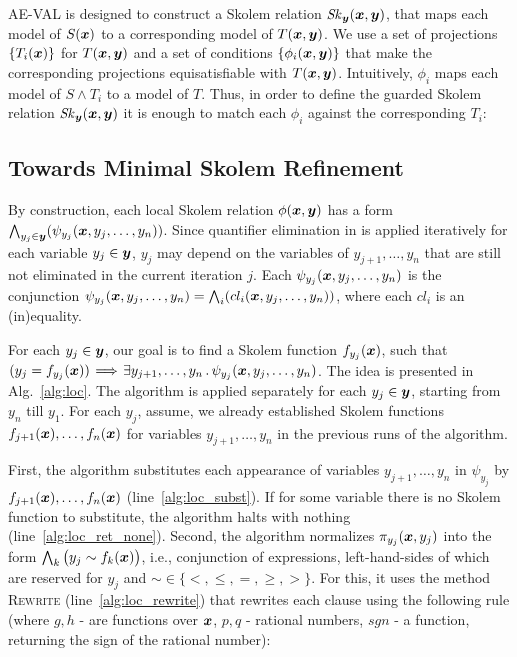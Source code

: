 \textsc{AE-VAL} is designed to
construct a Skolem relation
${\mathit{Sk}_{\vy} (\vx, \vy)}$, that maps each
model of $S(\vx)$ to a corresponding model of $T(\vx,\vy)$.
We use a set of
projections $\{T_{i}(\vx)\}$ for $T(\vx,\vy)$ and a set of conditions $\{\phi_i
(\vx, \vy)\}$
that make the corresponding projections equisatisfiable with $T(\vx,\vy)$.
Intuitively, $\phi_i$ maps each model of $S \land T_{i}$ to a model of $T$.
Thus, in order to define the guarded Skolem relation $\mathit{Sk}_{\vy}(\vx, \vy)$ it is enough to 
match each $\phi_i$ against the corresponding $T_{i}$:

\skolemcases


\subsection{Towards Minimal Skolem Refinement}
\label{sec:new}

\localfactoralg

By construction, each local Skolem relation $\phi(\vx,\vy)$ has a form $\Land_{y_j \in \vy}(\psi_{y_j}(\vx,y_{j},\ldots,y_{n}))$.
Since quantifier elimination in \aeval is applied iteratively for each variable $y_j \in \vy$, $y_j$ may depend on the variables of $y_{j+1},\ldots, y_{n}$ that are still not eliminated in the current iteration $j$.
Each $\psi_{y_j}(\vx,y_{j},\ldots,y_{n})$ is the conjunction
$\psi_{y_j}(\vx,y_{j},\ldots,y_{n}) = \Land_{i}(cl_i(\vx,y_{j},\ldots,y_{n}))$,
where each $cl_i$ is  an (in)equality.

For each $y_j\in \vy$, our goal is to find a Skolem function $f_{y_j}(\vx)$, such that $(y_j = f_{y_j}(\vx)) \!\implies\! \exists y_{j+1},\ldots,y_{n} \such \psi_{y_j}(\vx,y_{j},\ldots,y_{n}) $.
The idea is presented in Alg.~\ref{alg:loc}.
The algorithm is applied separately for each $y_j \in \vy$, starting from $y_n$ till $y_1$.
For each $y_j$, assume, we already established Skolem functions $f_{j+1}(\vx),\ldots,f_{n}(\vx)$ for variables $y_{j+1},\ldots,y_n$ in the previous runs of the algorithm. 

First, the algorithm substitutes each appearance of variables $y_{j+1},\ldots, y_{n}$ in $\psi_{y_j}$ by $f_{j+1}(\vx),\ldots,f_{n}(\vx)$ (line~\ref{alg:loc_subst}).
If for some variable there is no Skolem function to substitute, the algorithm halts with nothing
(line~\ref{alg:loc_ret_none}).
Second, the algorithm normalizes $\pi_{y_j}(\vx,y_{j})$ into the form
$\Land_k \big(y_{j} \sim f_k(\vx)\big)$, i.e., conjunction of
expressions, left-hand-sides of which are reserved for $y_j$ and ${\sim
\in \{<, \le, =, \ge, >\}}$.
For this, it uses the method \textsc{Rewrite} (line~\ref{alg:loc_rewrite}) that rewrites each clause using the following rule (where $g,h$ - are functions over $\vx$, $p,q$ - rational numbers, $\mathit{sgn}$ - a function, returning the sign of the rational number):

